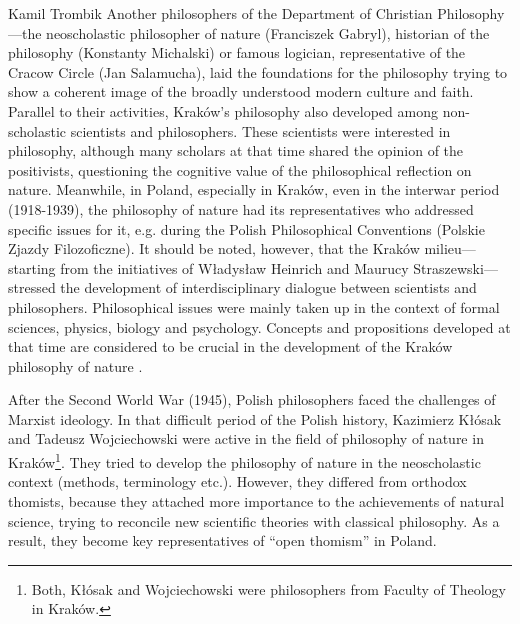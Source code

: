 \begin{artengenv}{Kamil Trombik}
Another philosophers of the Department of Christian Philosophy---the neoscholastic philosopher of nature (Franciszek
Gabryl), historian of the philosophy (Konstanty Michalski) or famous logician, representative of the
Cracow Circle (Jan Salamucha), laid the foundations for the philosophy trying to show a coherent image of the broadly
understood modern culture and faith. Parallel to their activities, Kraków's philosophy also developed among
non-scholastic scientists and philosophers. These scientists were interested in philosophy, although many scholars at
that time shared the opinion of the positivists, questioning the cognitive value of the philosophical reflection on
nature. Meanwhile, in Poland, especially in Kraków, even in the interwar period (1918-1939), the philosophy of nature
had its representatives who addressed specific issues for it, e.g. during the Polish Philosophical Conventions (Polskie
Zjazdy Filozoficzne). It should be noted, however, that the Kraków milieu---starting from the initiatives of Władysław
Heinrich and Maurucy Straszewski---stressed the development of interdisciplinary dialogue between scientists and
philosophers. Philosophical issues were mainly taken up in the context of formal sciences, physics, biology and
psychology. Concepts and propositions developed at that time are considered to be crucial in the development of the
Kraków philosophy of nature
\parencite{heller_krakowska_2007,dziedzic_historia_2007,polak_tradycja_2018}.

After the Second World War (1945), Polish philosophers faced the challenges of Marxist ideology. In that difficult
period of the Polish history, Kazimierz Kłósak and Tadeusz Wojciechowski were active in the field of philosophy of
nature in Kraków\footnote{Both, Kłósak and Wojciechowski were philosophers from Faculty of Theology in Kraków. }. They
tried to develop the philosophy of nature in the neoscholastic context (methods, terminology etc.). However, they
differed from orthodox thomists, because they attached more importance to the achievements of natural science, trying
to reconcile new scientific theories with classical philosophy. As a result, they become key representatives of ``open
thomism'' in Poland.


\end{artengenv}
